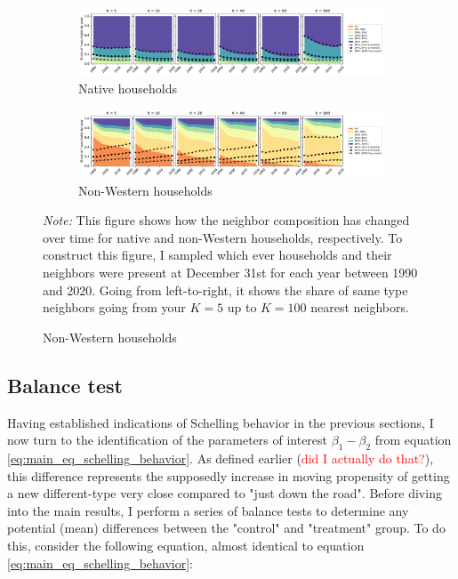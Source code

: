 \documentclass[main.tex]{subfiles}
\begin{document}
\begin{landscape}
\begin{figure}
    \centering
    \caption{Same type neighbor by $K$-nearest proximity (1990-2020)}
    \label{fig:temporal_development_knn}
    \begin{subfigure}{1.5\textwidth}
    \includegraphics[width=\linewidth]{figs/temporal_knn_native_1990_2020_w_sim.pdf}
    \caption{Native households}
    \label{fig:temporal_knn_native_1990_2020}
    \end{subfigure}	
    \begin{subfigure}{1.5\textwidth}
    \includegraphics[width=\linewidth]{figs/temporal_knn_non_west_1990_2020_w_sim.pdf}
    \caption{Non-Western households}
    \label{fig:temporal_knn_non_west_1990_2020}
    \end{subfigure}	
\begin{tablenotes}
\item \footnotesize \textit{Note:} This figure shows how the neighbor composition has changed over time for native and non-Western households, respectively. To construct this figure, I sampled which ever households and their neighbors were present at December 31st for each year between 1990 and 2020. Going from left-to-right, it shows the share of same type neighbors going from your $K=5$ up to $K=100$ nearest neighbors.
\end{tablenotes}
\end{figure}
\end{landscape}

\subsection{Balance test}

Having established indications of Schelling behavior in the previous sections, I now turn to the identification of the parameters of interest $\beta_1-\beta_2$ from equation \ref{eq:main_eq_schelling_behavior}. As defined earlier (\textcolor{red}{did I actually do that?}), this difference represents the supposedly increase in moving propensity of getting a new different-type very close compared to "just down the road". Before diving into the main results, I perform a series of balance tests to determine any potential (mean) differences between the "control" and "treatment" group. To do this, consider the following equation, almost identical to equation \ref{eq:main_eq_schelling_behavior}:
\end{document}
